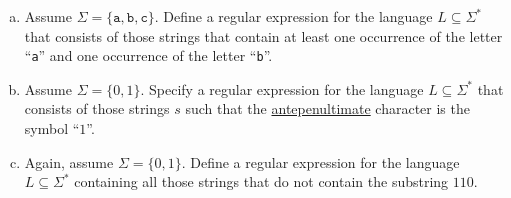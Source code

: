 \exerciseEng
\begin{enumerate}[(a)]
\item Assume $ \Sigma = \{ \mathtt{a}, \mathtt{b}, \mathtt{c} \} $. Define a regular expression for the language $ L \subseteq \Sigma^* $ that consists of those strings that contain at least one occurrence of the letter ``\texttt{a}'' and one occurrence of the letter ``\texttt{b}''.

\item Assume $ \Sigma = \{ 0, 1 \} $. Specify a regular expression for the language $ L \subseteq \Sigma^* $ that consists of those strings $ s $ such that the \href{https://dictionary.cambridge.org/dictionary/english/antepenultimate}{antepenultimate} character is the symbol ``$ 1 $''.

\item Again, assume $\Sigma = \{ 0, 1 \}$. Define a regular expression for the language $L \subseteq \Sigma^*$
      containing all those strings that do not contain the substring $ 110 $.  



\end{enumerate}
